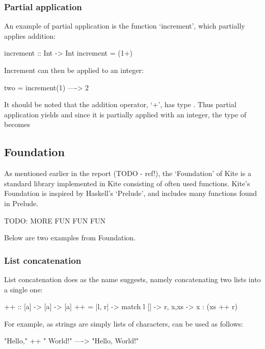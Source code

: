 \subsubsection{Partial application}

An example of partial application is the function `increment', which partially applies addition:

\begin{kite}

increment :: Int -> Int
increment = (1+)
\end{kite}

Increment can then be applied to an integer:

\begin{kite}
  
two = increment(1) ----> 2
\end{kite}


It should be noted that the addition operator, `+', has type . Thus partial application yields  and since it is partially applied with an integer, the type of  becomes 

\subsection{Foundation}

As mentioned earlier in the report (TODO - ref!), the `Foundation' of Kite is a standard library implemented in Kite consisting of often used functions. Kite's Foundation is inspired by Haskell's `Prelude', and includes many functions found in
Prelude. 

TODO: MORE FUN FUN FUN

Below are two examples from Foundation.
\subsubsection{List concatenation}

List concatenation does as the name suggests, namely concatenating two lists into a single one:
\begin{kite}

{++} :: [a] -> [a] -> [a]
{++} = |l, r| -> {
  match l {
    [] -> r,
    x,xs -> x : (xs ++ r)
  }
}
\end{kite}

For example, as strings are simply lists of characters, \code{++} can be used as follows:

\begin{kite}

"Hello," ++ " World!" ----> "Hello, World!"
\end{kite}

